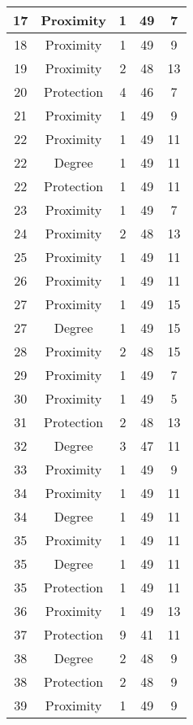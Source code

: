 \documentclass[results.tex]{subfiles}
\begin{document}
\begin{center}
\begin{tabular}{| c || c | c | c | c |}
    \hline
    17 & Proximity & 1 & 49 & 7 \\ 
    \hline
    18 & Proximity & 1 & 49 & 9 \\ 
    \hline
    19 & Proximity & 2 & 48 & 13 \\ 
    \hline
    20 & Protection & 4 & 46 & 7 \\ 
    \hline
    21 & Proximity & 1 & 49 & 9 \\ 
    \hline
    22 & Proximity & 1 & 49 & 11 \\ 
    \hline
    22 & Degree & 1 & 49 & 11 \\ 
    \hline
    22 & Protection & 1 & 49 & 11 \\ 
    \hline
    23 & Proximity & 1 & 49 & 7 \\ 
    \hline
    24 & Proximity & 2 & 48 & 13 \\ 
    \hline
    25 & Proximity & 1 & 49 & 11 \\ 
    \hline
    26 & Proximity & 1 & 49 & 11 \\ 
    \hline
    27 & Proximity & 1 & 49 & 15 \\ 
    \hline
    27 & Degree & 1 & 49 & 15 \\ 
    \hline
    28 & Proximity & 2 & 48 & 15 \\ 
    \hline
    29 & Proximity & 1 & 49 & 7 \\ 
    \hline
    30 & Proximity & 1 & 49 & 5 \\ 
    \hline
    31 & Protection & 2 & 48 & 13 \\ 
    \hline
    32 & Degree & 3 & 47 & 11 \\ 
    \hline
    33 & Proximity & 1 & 49 & 9 \\ 
    \hline
    34 & Proximity & 1 & 49 & 11 \\ 
    \hline
    34 & Degree & 1 & 49 & 11 \\ 
    \hline
    35 & Proximity & 1 & 49 & 11 \\ 
    \hline
    35 & Degree & 1 & 49 & 11 \\ 
    \hline
    35 & Protection & 1 & 49 & 11 \\ 
    \hline
    36 & Proximity & 1 & 49 & 13 \\ 
    \hline
    37 & Protection & 9 & 41 & 11 \\ 
    \hline
    38 & Degree & 2 & 48 & 9 \\ 
    \hline
    38 & Protection & 2 & 48 & 9 \\ 
    \hline
    39 & Proximity & 1 & 49 & 9 \\ 

\end{tabular}
\end{center}
\end{document}
